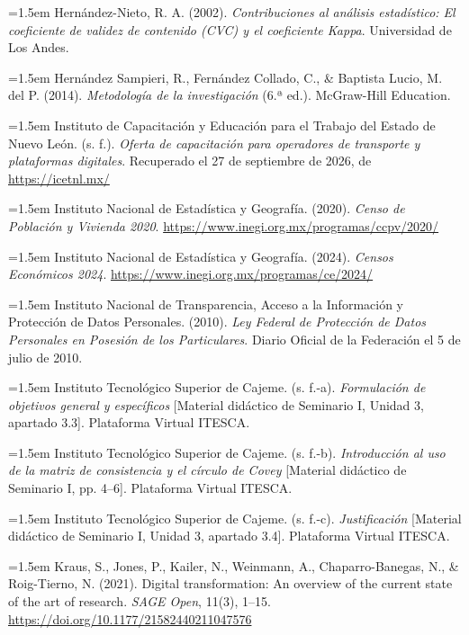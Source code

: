 {\hangindent=1.5em Hernández-Nieto, R. A. (2002). \textit{Contribuciones al análisis estadístico: El coeficiente de validez de contenido (CVC) y el coeficiente Kappa}. Universidad de Los Andes.

\hangindent=1.5em Hernández Sampieri, R., Fernández Collado, C., \& Baptista Lucio, M. del P. (2014). \textit{Metodología de la investigación} (6.ª ed.). McGraw-Hill Education.

\hangindent=1.5em Instituto de Capacitación y Educación para el Trabajo del Estado de Nuevo León. (s. f.). \textit{Oferta de capacitación para operadores de transporte y plataformas digitales}. Recuperado el 27 de septiembre de 2026, de \url{https://icetnl.mx/}

\hangindent=1.5em Instituto Nacional de Estadística y Geografía. (2020). \textit{Censo de Población y Vivienda 2020}. \url{https://www.inegi.org.mx/programas/ccpv/2020/}

\hangindent=1.5em Instituto Nacional de Estadística y Geografía. (2024). \textit{Censos Económicos 2024}. \url{https://www.inegi.org.mx/programas/ce/2024/}

\hangindent=1.5em Instituto Nacional de Transparencia, Acceso a la Información y Protección de Datos Personales. (2010). \textit{Ley Federal de Protección de Datos Personales en Posesión de los Particulares}. Diario Oficial de la Federación el 5 de julio de 2010.

\hangindent=1.5em Instituto Tecnológico Superior de Cajeme. (s. f.-a). \textit{Formulación de objetivos general y específicos} [Material didáctico de Seminario I, Unidad 3, apartado 3.3]. Plataforma Virtual ITESCA.

\hangindent=1.5em Instituto Tecnológico Superior de Cajeme. (s. f.-b). \textit{Introducción al uso de la matriz de consistencia y el círculo de Covey} [Material didáctico de Seminario I, pp. 4--6]. Plataforma Virtual ITESCA.

\hangindent=1.5em Instituto Tecnológico Superior de Cajeme. (s. f.-c). \textit{Justificación} [Material didáctico de Seminario I, Unidad 3, apartado 3.4]. Plataforma Virtual ITESCA.

\hangindent=1.5em Kraus, S., Jones, P., Kailer, N., Weinmann, A., Chaparro-Banegas, N., \& Roig-Tierno, N. (2021). Digital transformation: An overview of the current state of the art of research. \textit{SAGE Open}, 11(3), 1--15. \url{https://doi.org/10.1177/21582440211047576}

}
